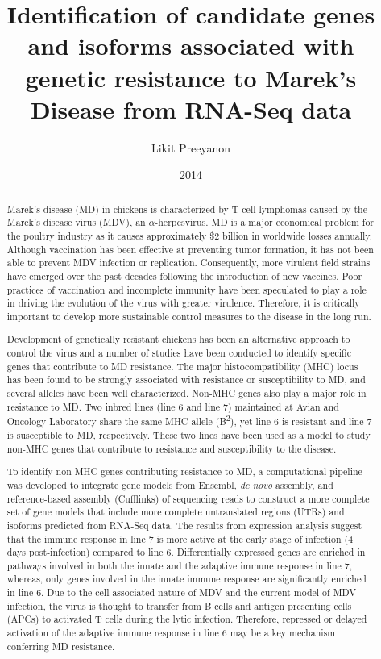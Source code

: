 \documentclass[lscape]{msu-thesis}
\title{Identification of candidate genes and isoforms associated with
genetic resistance to Marek's Disease from RNA-Seq data}
\author{Likit Preeyanon}
\date{2014}
\begin{document}
\frontmatter
\maketitlepage
\begin{abstract}

Marek's disease (MD) in chickens is characterized by T cell
lymphomas caused by the Marek's disease virus (MDV), an
$\alpha$-herpesvirus. MD is a major economical problem for
the poultry industry as it causes approximately \$2 billion
in worldwide losses annually. Although vaccination has been
effective at preventing tumor formation, it has not been
able to prevent MDV infection or replication.  Consequently,
more virulent field strains have emerged over the past
decades following the introduction of new vaccines. Poor
practices of vaccination and incomplete immunity have been
speculated to play a role in driving the evolution of the
virus with greater virulence. Therefore, it is critically
important to develop more sustainable control measures to
the disease in the long run.

Development of genetically resistant chickens has been an
alternative approach to control the virus and a number of studies
have been conducted to identify specific genes that contribute to
MD resistance. The major histocompatibility (MHC) locus has been
found to be strongly associated with resistance or susceptibility
to MD, and several alleles have been well characterized.  Non-MHC
genes also play a major role in resistance to MD. Two inbred
lines (line 6 and line 7) maintained at Avian and Oncology
Laboratory share the same MHC allele (B\textsuperscript{2}), yet
line 6 is resistant and line 7 is susceptible to MD,
respectively.  These two lines have been used as a model to study
non-MHC genes that contribute to resistance and susceptibility to
the disease.

To identify non-MHC genes contributing resistance to MD, a
computational pipeline was developed to integrate gene models
from Ensembl, {\em de novo} assembly, and reference-based
assembly (Cufflinks) of sequencing reads to construct a more
complete set of gene models that include more complete
untranslated regions (UTRs) and isoforms predicted from RNA-Seq
data. The results from expression analysis suggest that the
immune response in line 7 is more active at the early stage of
infection (4 days post-infection) compared to line 6.
Differentially expressed genes are enriched in pathways involved
in both the innate and the adaptive immune response in line 7,
whereas, only genes involved in the innate immune response are
significantly enriched in line 6. Due to the cell-associated
nature of MDV and the current model of MDV infection, the virus
is thought to transfer from B cells and antigen presenting cells
(APCs) to activated T cells during the lytic infection.
Therefore, repressed or delayed activation of the adaptive immune
response in line 6 may be a key mechanism conferring MD
resistance.


\end{abstract}
\end{document}
